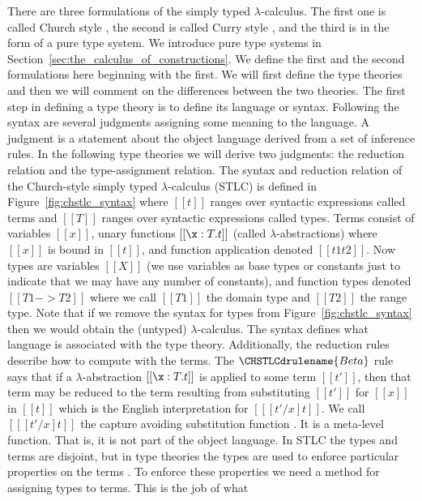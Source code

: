 There are three formulations of the simply typed $\lambda$-calculus.
The first one is called Church style
\cite{Girard:1989,Barendregt:1992,Church:1940}, the second is called
Curry style \cite{Barendregt:1992,Reynolds:1998}, and the third is in
the form of a pure type system.  We introduce pure type systems in
Section~\ref{sec:the_calculus_of_constructions}.  We define the first
and the second formulations here beginning with the first.  We will
first define the type theories and then we will comment on the
differences between the two theories.  The first step in defining a
type theory is to define its language or syntax.  Following the syntax
are several judgments assigning some meaning to the language.  A
judgment is a statement about the object language derived from a set
of inference rules.  In the following type theories we will derive two
judgments: the reduction relation and the type-assignment relation.
The syntax and reduction relation of the Church-style simply typed
$\lambda$-calculus (STLC) is defined in Figure~\ref{fig:chstlc_syntax}
where $[[t]]$ ranges over syntactic expressions called terms and
$[[T]]$ ranges over syntactic expressions called types. Terms consist
of variables $[[x]]$, unary functions $[[\x:T.t]]$ (called
$\lambda$-abstractions) where $[[x]]$ is bound in $[[t]]$, and
function application denoted $[[t1 t2]]$.  Now types are variables
$[[X]]$ (we use variables as base types or constants just to indicate
that we may have any number of constants), and function types denoted
$[[T1 -> T2]]$ where we call $[[T1]]$ the domain type and $[[T2]]$ the
range type.  Note that if we remove the syntax for types from
Figure~\ref{fig:chstlc_syntax} then we would obtain the (untyped)
$\lambda$-calculus.  The syntax defines what language is associated
with the type theory.  Additionally, the reduction rules describe how
to compute with the terms.  The $\CHSTLCdrulename{\normalsize Beta}$ rule says
that if a $\lambda$-abstraction $[[\x:T.t]]$ is applied to some term
$[[t']]$, then that term may be reduced to the term resulting from
substituting $[[t']]$ for $[[x]]$ in $[[t]]$ which is the English
interpretation for $[[ [t'/x]t]]$. We call $[[ [t'/x] t]]$ the capture
avoiding substitution function . It is a meta-level function. That is,
it is not part of the object language. In STLC the types and terms are
disjoint, but in type theories the types are used to enforce
particular properties on the terms .  To enforce these properties we
need a method for assigning types to terms.  This is the job of what
